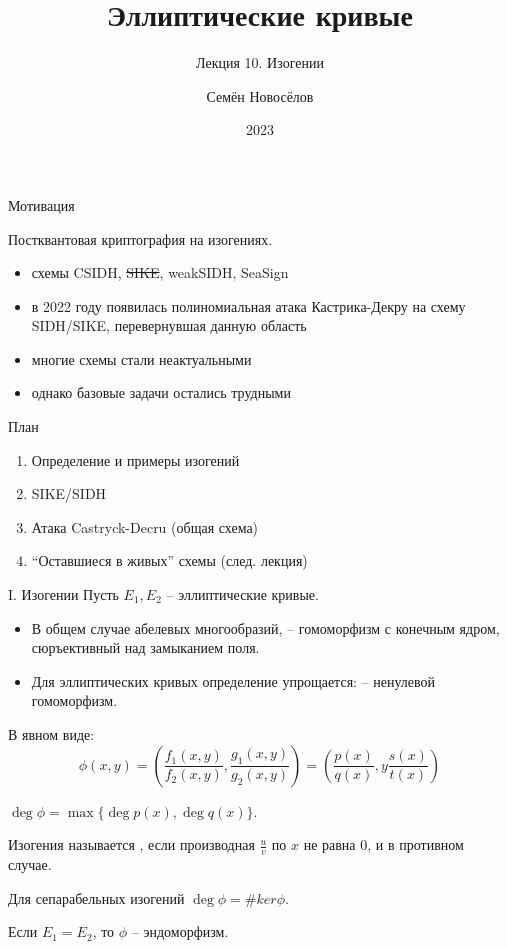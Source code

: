 \documentclass{beamer}
\title{Эллиптические кривые}
\subtitle{Лекция 10. Изогении}
\author{Семён Новосёлов}
\institute{БФУ им. И. Канта}
\date{2023}
\begin{document}
\frame{\titlepage}

\begin{frame}{Мотивация}
	
Постквантовая криптография на изогениях.
\vspace{0.5em}
	
\begin{itemize}
	\item схемы CSIDH, \sout{SIKE}, weakSIDH, SeaSign
	\item в 2022 году появилась полиномиальная атака Кастрика-Декру на схему SIDH/SIKE, перевернувшая данную область
	\item многие схемы стали неактуальными
	\item однако базовые задачи остались трудными
\end{itemize}
\end{frame}

\begin{frame}{План}
\begin{enumerate}
	\item Определение и примеры изогений
	\item SIKE/SIDH
	\item Атака Castryck-Decru (общая схема)
	\item ``Оставшиеся в живых'' схемы (след. лекция)
\end{enumerate}
\end{frame}

\begin{frame}{I. Изогении}
Пусть $E_1, E_2$ -- эллиптические кривые.

\begin{itemize}
    \item В общем случае абелевых многообразий,  -- гомоморфизм с конечным ядром, сюръективный над замыканием поля.
    \item Для эллиптических кривых определение упрощается:  -- ненулевой гомоморфизм.
\end{itemize}
\end{frame}

\begin{frame}
    В явном виде:
	\[
	\phi(x, y) = \left( \frac{f_1(x,y)}{f_2(x,y)}, \frac{g_1(x,y)}{g_2(x,y)} \right)
	=
	\left(
	\frac{p(x)}{q(x)}, y \frac{s(x)}{t(x)}
	\right)
	\]
	
	\vspace*{1em}
	 $\deg\phi = \max\{\deg{p(x)}, \deg{q(x)}\}$.
	
	\vspace{1em}
	Изогения называется , если производная $\frac{u}{v}$ по $x$ не равна $0$, и  в противном случае.
	
	\vspace{1em}
	Для сепарабельных изогений $\deg\phi = \#ker\phi$.
	
	\vspace{1em}
	Если $E_1 = E_2$, то $\phi$ -- эндоморфизм.
	
\end{frame}
\end{document}
